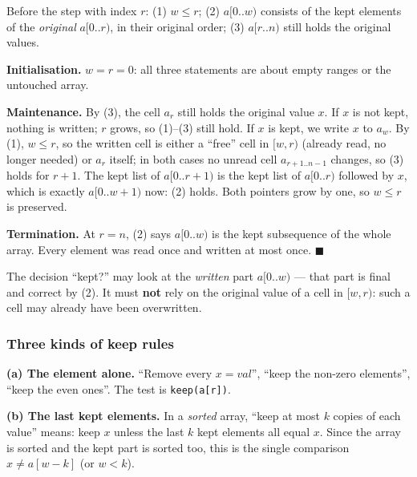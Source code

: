 \begin{invariantbox}
Before the step with index $r$: (1) $w \le r$; (2) $a[0..w)$ consists of the kept elements of the \emph{original} $a[0..r)$, in their original order; (3) $a[r..n)$ still holds the original values.

\textbf{Initialisation.} $w = r = 0$: all three statements are about empty ranges or the untouched array.

\textbf{Maintenance.} By (3), the cell $a_r$ still holds the original value $x$. If $x$ is not kept, nothing is written; $r$ grows, so (1)--(3) still hold. If $x$ is kept, we write $x$ to $a_w$. By (1), $w \le r$, so the written cell is either a ``free'' cell in $[w, r)$ (already read, no longer needed) or $a_r$ itself; in both cases no unread cell $a_{r+1..n-1}$ changes, so (3) holds for $r+1$. The kept list of $a[0..r+1)$ is the kept list of $a[0..r)$ followed by $x$, which is exactly $a[0..w+1)$ now: (2) holds. Both pointers grow by one, so $w \le r$ is preserved.

\textbf{Termination.} At $r = n$, (2) says $a[0..w)$ is the kept subsequence of the whole array. Every element was read once and written at most once. \hfill$\blacksquare$
\end{invariantbox}

The decision ``kept?'' may look at the \emph{written} part $a[0..w)$ --- that part is final and correct by (2). It must \textbf{not} rely on the original value of a cell in $[w, r)$: such a cell may already have been overwritten.

\subsubsection*{Three kinds of keep rules}

\textbf{(a) The element alone.} ``Remove every $x = \mathit{val}$'', ``keep the non-zero elements'', ``keep the even ones''. The test is \texttt{keep(a[r])}.

\textbf{(b) The last kept elements.} In a \emph{sorted} array, ``keep at most $k$ copies of each value'' means: keep $x$ unless the last $k$ kept elements all equal $x$. Since the array is sorted and the kept part is sorted too, this is the single comparison $x \ne a[w-k]$ (or $w < k$).

\begin{diagrambox}
\end{diagrambox}

